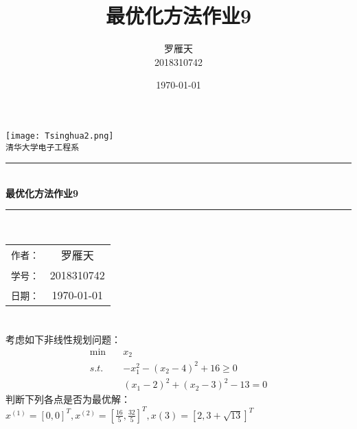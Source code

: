 \documentclass[a4paper]{article}
\title{最优化方法作业9}
\author{罗雁天 \\
2018310742}
\date{\today}
\begin{document}
\newcommand{\HRule}{\rule{\linewidth}{0.5mm}}
\begin{titlepage}
	\begin{center}
		\texttt{[image: Tsinghua2.png]}\\[1cm]
		\textsc{\Large \texttt{清华大学电子工程系}}\\[1cm]
		\HRule \\[1cm]
		{\Huge \bfseries 最优化方法作业9}\\[0.4cm]
		\HRule \\[3.5cm]
		\begin{minipage}{0.4\textwidth}
			\begin{center}
				\Large
				\begin{tabular}{cc}
					\texttt{作者：} & 罗雁天 \\[0.5cm]
					\texttt{学号：} & 2018310742 \\[0.5cm]
					\texttt{日期：} & \today
				\end{tabular}
			\end{center}
		\end{minipage}
		\vfill
	\end{center}
\end{titlepage}

\section{}
考虑如下非线性规划问题：
\begin{equation}
\begin{aligned}
\min\quad&x_2 \\
s.t.\quad&-x_1^2-(x_2-4)^2+16\ge 0\\
&(x_1-2)^2+(x_2-3)^2-13=0
\end{aligned}
\end{equation}
判断下列各点是否为最优解：
$x^{(1)}=[0,0]^T,x^{(2)}=\left[\frac{16}{5}, \frac{32}{5}\right]^T,x{(3)}=\left[2,3+\sqrt{13}\right]^T$
\end{document}
